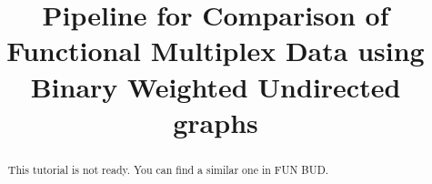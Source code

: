 \documentclass[justified]{tufte-handout}
\title{Pipeline for Comparison of Functional Multiplex Data using Binary Weighted Undirected graphs}
\begin{document}
\maketitle

\begin{abstract}
\noindent
This tutorial is not ready. You can find a similar one in FUN BUD.
\end{abstract}
\end{document}
